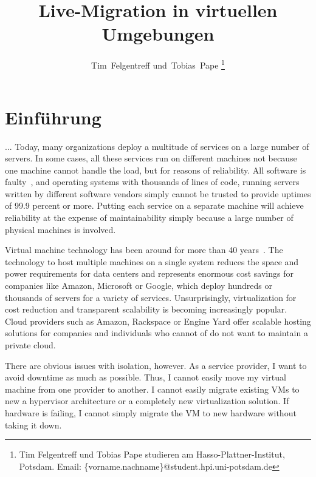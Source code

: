 \documentclass[journal]{IEEEtran}
\makeatletter
\def\markboth#1#2{\def\leftmark{\@IEEEcompsoconly{\sffamily}\MakeUppercase{\protect#1}}%
\def\rightmark{\@IEEEcompsoconly{\sffamily}\MakeUppercase{\protect#2}}}
\makeatother
\begin{document}
\title{Live-Migration in virtuellen Umgebungen}
\author{Tim~Felgentreff und~Tobias~Pape%
\thanks{%
  Tim Felgentreff und Tobias Pape studieren am
  Hasso-Plattner-Institut, Potsdam.\goodbreak
  Email: \{vorname.nachname\}@student.hpi.uni-potsdam.de}%
}
\markboth{Industrieseminar Cloud-Computing}{Felgentreff, Pape: Live-Migration}

\maketitle

\begin{abstract}
  
\end{abstract}

\IEEEpeerreviewmaketitle


\section{Einführung}
\label{sec:einfuehrung}
 ...
Today, many organizations deploy a multitude of services on a large
number of servers. In some cases, all these services run on different
machines not because one machine cannot handle the load, but for
reasons of reliability.  All software is faulty~\cite{zellerprograms},
and operating systems with thousands of lines of code, running servers
written by different software vendors simply cannot be trusted to
provide uptimes of 99.9 percent or more. Putting each service on a
separate machine will achieve reliability at the expense of
maintainability simply because a large number of physical machines is
involved.

Virtual machine technology has been around for more than 40
years~\cite{tanenbaum1992modern}. The technology to host multiple
machines on a single system reduces the space and power requirements
for data centers and represents enormous cost savings for companies
like Amazon, Microsoft or Google, which deploy hundreds or thousands
of servers for a variety of services. Unsurprisingly, virtualization
for cost reduction and transparent scalability is becoming
increasingly popular. Cloud providers such as Amazon, Rackspace or
Engine Yard offer scalable hosting solutions for companies and
individuals who cannot of do not want to maintain a private cloud.

There are obvious issues with isolation, however. As a service
provider, I want to avoid downtime as much as possible. Thus, I cannot
easily move my virtual machine from one provider to another. I cannot
easily migrate existing VMs to new a hypervisor architecture or a
completely new virtualization solution. If hardware is failing, I
cannot simply migrate the VM to new hardware without taking it down.
\end{document}
